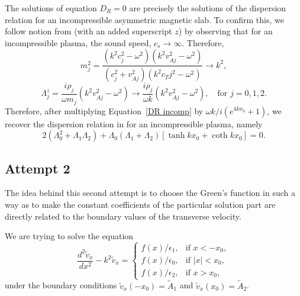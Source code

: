 \documentclass{aastex61}
\begin{document}
The solutions of equation $D_R = 0$ are precisely the solutions of the dispersion relation for an incompressible asymmetric magnetic slab. To confirm this, we follow notion from \cite{zsa_etal18} (with an added superscript $z$) by observing that for an incompressible plasma, the sound speed, $c_s \to \infty$. Therefore,
\begin{equation}
m_j^2 = \frac{(k^2c_j^2 - \omega^2)(k^2v_{Aj}^2 - \omega^2)}{(c_j^2 + v_{Aj}^2)(k^2c_Tj^2 - \omega^2)} \to k^2,
\end{equation}
\begin{equation}
\Lambda_j^z = \frac{i\rho_j}{\omega m_j}(k^2v_{Aj}^2 - \omega^2) \to \frac{i \rho_j}{\omega k}(k^2v_{Aj}^2 - \omega^2), \quad \text{for } j = 0,1,2.
\end{equation}
Therefore, after multiplying Equation~\eqref{DR incomp} by $\omega k / i(e^{4kx_0} + 1)$, we recover the dispersion relation in \cite{zsa_etal18} for an incompressible plasma, namely
\begin{equation}
2(\Lambda_0^2 + \Lambda_1\Lambda_2) + \Lambda_0(\Lambda_1 + \Lambda_2)[\tanh{kx_0} + \coth{kx_0}] = 0.
\end{equation}



\subsection{Attempt 2}

The idea behind this second attempt is to choose the Green's function in such a way as to make the constant coefficients of the particular solution part are directly related to the boundary values of the transverse velocity.

We are trying to solve the equation
\begin{equation}
\frac{d^2\tilde{v}_x}{dx^2} - k^2\tilde{v}_x = 
\begin{cases}
f(x)/\epsilon_1, & \text{if  } x<-x_0,\\
f(x)/\epsilon_0, & \text{if  } |x|<x_0,\\
f(x)/\epsilon_2, & \text{if  } x>x_0,
\end{cases}
\label{ivp gov slab 2}
\end{equation}
under the boundary conditions $\tilde{v}_x(-x_0) = \tilde{A}_1$ and $\tilde{v}_x(x_0) = \tilde{A}_2$.
\end{document}
